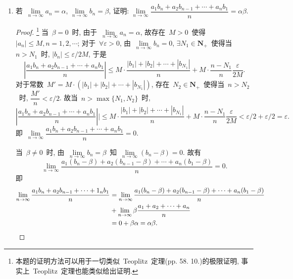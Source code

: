 \documentclass[UTF8,a4paper,11pt,twoside]{book}
\begin{document}
\begin{enumerate}
\begin{proof}
		      又由~$a_{n+1}=a_n(1-a_n)$, 同时取倒数就有
		      \[
			      \dfrac{1}{a_{n+1}}=\dfrac{1}{a_n(1-a_n)}=\dfrac{1}{a_n}+\dfrac{1}{1-a_n},
		      \]
		      故~$\lim\limits_{n\to\infty} \dfrac{1}{a_{n+1}}-\dfrac{1}{a_n}=\lim\limits_{n\to\infty} \dfrac{1}{1-a_n}=1$. 由~Cauchy~命题可知~$\lim\limits_{n\to\infty} \dfrac{1}{n}\sum\limits_{k=1}^{n-1}\left(\dfrac{1}{a_{k+1}}-\dfrac{1}{a_k}\right)=1$, 即~$\lim\limits_{n\to\infty}\left(\dfrac{1}{na_n}-\dfrac{1}{na_1}\right)=1$. 于是就有~$\lim\limits_{n\to\infty} \dfrac{1}{na_n}=1$, 故~$\lim\limits_{n\to\infty} na_n=1$.\qedhere
	      \end{proof}
	\item 若~$\lim\limits_{n\to\infty} a_n=\alpha$, $\lim\limits_{n\to\infty} b_n=\beta$, 证明: $\lim\limits_{n\to\infty} \dfrac{a_1b_n+a_2b_{n-1}+\cdots+a_nb_1}{n}=\alpha\beta$.
	      \begin{proof}
		      \footnote{本题的证明方法可以用于一切类似~Teoplitz~定理(pp. 58. 10.)的极限证明, 事实上~Teoplitz~定理也能类似给出证明.}
		      当~$\beta=0$~时, 由于~$\lim\limits_{n\to\infty} a_n=\alpha$, 故存在~$M>0$~使得~$|a_n|\leqslant M, n=1,2,\cdots$; 对于~$\forall\varepsilon>0$, 由~$\lim\limits_{n\to\infty} b_n=0$, $\exists N_1\in\mathbf{N}_{+}$~使得当~$n>N_1$~时, $|b_n|\leqslant\varepsilon/2M$, 于是
		      \[
			      \left|\dfrac{a_1b_n+a_2b_{n-1}+\cdots+a_nb_1}{n}\right|\leqslant M\cdot\dfrac{|b_1|+|b_2|+\cdots+|b_{N_1}|}{n}+M\cdot\dfrac{n-N_1}{n}\dfrac{\varepsilon}{2M}.
		      \]
		      对于常数~$M'=M\cdot(|b_1|+|b_2|+\cdots+|b_{N_1}|)$, 存在~$N_2\in\mathbf{N}_{+}$~使得当~$n>N_2$~时, $\dfrac{M'}{n}<\varepsilon/2$. 故当~$n>\max\{N_1,N_2\}$~时,
		      \[
			      \left|\dfrac{a_1b_n+a_2b_{n-1}+\cdots+a_nb_1}{n}\right||\leqslant M\cdot\dfrac{|b_1|+|b_2|+\cdots+|b_{N_1}|}{n}+M\cdot\dfrac{n-N_1}{n}\dfrac{\varepsilon}{2M}<\varepsilon/2+\varepsilon/2=\varepsilon.
		      \]
		      即~$\lim\limits_{n\to\infty} \dfrac{a_1b_n+a_2b_{n-1}+\cdots+a_nb_1}{n}=0$.

		      当~$\beta\neq 0$~时, 由~$\lim\limits_{n\to\infty} b_n=\beta$~知~$\lim\limits_{n\to\infty} (b_n-\beta)=0$. 故有
		      \[
			      \lim\limits_{n\to\infty} \dfrac{a_1(b_n-\beta)+a_2(b_{n-1}-\beta)+\cdots+a_n(b_1-\beta)}{n}=0.
		      \]
		      即
		      \begin{equation*}
			      \begin{split}
				      \lim\limits_{n\to\infty} \dfrac{a_1b_n+a_2b_{n-1}+\cdots+1_nb_1}{n}&= \lim\limits_{n\to\infty} \dfrac{a_1(b_n-\beta)+a_2(b_{n-1}-\beta)+\cdots+a_n(b_1-\beta)}{n}\\
				      &+\lim\limits_{n\to\infty} \beta\dfrac{a_1+a_2+\cdots+a_n}{n}\\
				      &=0+\beta\alpha=\alpha\beta.\qedhere
			      \end{split}
		      \end{equation*}
	      \end{proof}
\end{enumerate}
\end{document}
